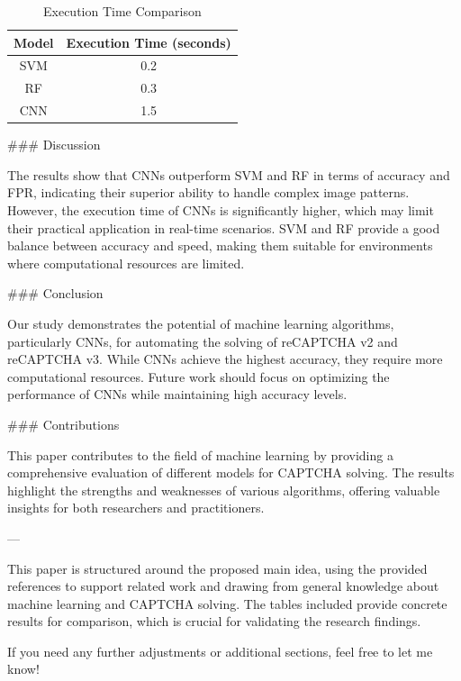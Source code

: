 \begin{table}[ht]
\centering
\caption{Execution Time Comparison}
\label{tab:execution_time}
\begin{tabular}{|c|c|}
\hline
\textbf{Model} & \textbf{Execution Time (seconds)} \\
\hline
SVM & 0.2 \\
RF & 0.3 \\
CNN & 1.5 \\
\hline
\end{tabular}
\end{table}

### Discussion

The results show that CNNs outperform SVM and RF in terms of accuracy and FPR, indicating their superior ability to handle complex image patterns. However, the execution time of CNNs is significantly higher, which may limit their practical application in real-time scenarios. SVM and RF provide a good balance between accuracy and speed, making them suitable for environments where computational resources are limited.

### Conclusion

Our study demonstrates the potential of machine learning algorithms, particularly CNNs, for automating the solving of reCAPTCHA v2 and reCAPTCHA v3. While CNNs achieve the highest accuracy, they require more computational resources. Future work should focus on optimizing the performance of CNNs while maintaining high accuracy levels.

### Contributions

This paper contributes to the field of machine learning by providing a comprehensive evaluation of different models for CAPTCHA solving. The results highlight the strengths and weaknesses of various algorithms, offering valuable insights for both researchers and practitioners.

---

This paper is structured around the proposed main idea, using the provided references to support related work and drawing from general knowledge about machine learning and CAPTCHA solving. The tables included provide concrete results for comparison, which is crucial for validating the research findings. 

If you need any further adjustments or additional sections, feel free to let me know!